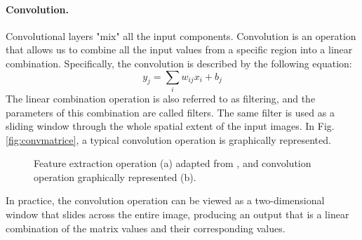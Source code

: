 \paragraph{Convolution.} Convolutional layers "mix" all the input components. Convolution is an operation that allows us to combine all the input values from a specific region into a linear combination. Specifically, the convolution is described by the following equation:
\begin{equation}
    \label{eq:convolution}
    y_j=\sum_iw_{ij}x_i+b_j
\end{equation}
The linear combination operation is also referred to as filtering, and the parameters of this combination are called filters. The same filter is used as a sliding window through the whole spatial extent of the input images. In Fig. \ref{fig:convmatrice}, a typical convolution operation is graphically represented.
\begin{figure}
    \centering
    \qquad
    \caption[Convolution operation.]{Feature extraction operation (a) adapted from \cite{giacomo_boracchi_convolutional_2021}, and convolution operation graphically represented (b)\cite{giacomo_boracchi_convolutional_2021}.}
\end{figure}
In practice, the convolution operation can be viewed as a two-dimensional window that slides across the entire image, producing an output that is a linear combination of the matrix values and their corresponding values.
